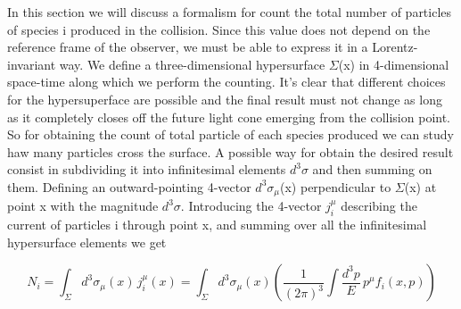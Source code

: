 \documentclass[12pt,a4paper]{book}
\begin{document}
	In this section we will discuss a formalism for count the total number of particles of species i produced in the collision. Since this value does not depend on the reference frame of the observer, we must be able to express it in a Lorentz-invariant way. We define a three-dimensional hypersurface $\Sigma$(x) in 4-dimensional space-time along which we perform the counting. It's clear that different choices for the hypersuperface are possible and the final result must not change as long as it completely closes off the future light cone emerging from the collision point. So for obtaining the count of total particle of each species produced we can study haw many particles cross the surface. A possible way for obtain the desired result consist in subdividing it into infinitesimal elements $d^3 \sigma$ and then summing on them. Defining an outward-pointing 4-vector $d^3 \sigma_\mu$(x) perpendicular to $\Sigma$(x) at point x with the magnitude $d^3 \sigma$. Introducing the 4-vector $j^\mu_i$ describing the current of particles i through point x, and summing over all the infinitesimal hypersurface elements we get
	
	\begin{equation}
		N_i = \int_{\Sigma} d^3 \sigma_\mu(x) \, j_i^\mu(x) = \int_{\Sigma} d^3 \sigma_\mu(x) \left( \frac{1}{(2\pi)^3} \int \frac{d^3 p}{E} \, p^\mu f_i(x,p) \right)
		\label{eq:particle_number}
	\end{equation}
	
\end{document}
